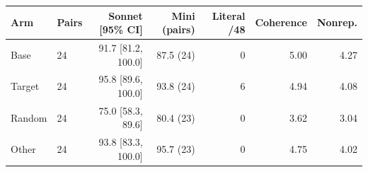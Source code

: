 \begin{tabular}{llrrrrr}
\toprule
Arm & Pairs & Sonnet [95\% CI] & Mini (pairs) & Literal /48 & Coherence & Nonrep. \\
\midrule
Base & 24 & 91.7 [81.2, 100.0] & 87.5 (24) & 0 & 5.00 & 4.27 \\
Target & 24 & 95.8 [89.6, 100.0] & 93.8 (24) & 6 & 4.94 & 4.08 \\
Random & 24 & 75.0 [58.3, 89.6] & 80.4 (23) & 0 & 3.62 & 3.04 \\
Other & 24 & 93.8 [83.3, 100.0] & 95.7 (23) & 0 & 4.75 & 4.02 \\
\bottomrule
\end{tabular}